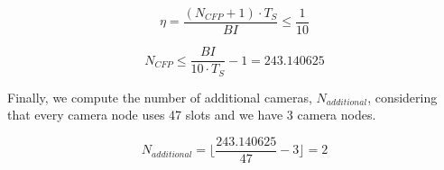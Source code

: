 \begin{equation}
\eta = \frac{(N_{CFP} + 1) \cdot T_S}{BI} \leq \frac{1}{10}
\end{equation}

\begin{equation}
N_{CFP} \leq \frac{BI}{10 \cdot T_S} - 1 = 243.140625
\end{equation}

Finally, we compute the number of additional cameras, $N_{additional}$, considering that every camera node uses 47 slots and we have 3 camera nodes.

\begin{equation}
N_{additional} = \lfloor \frac{243.140625}{47} - 3 \rfloor = 2 
\end{equation}







